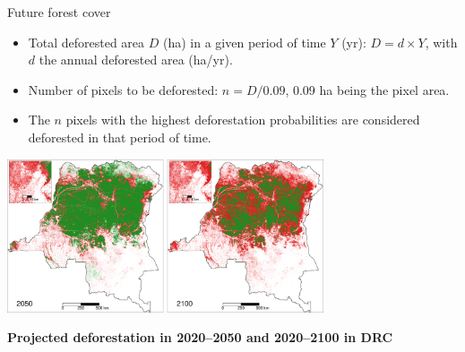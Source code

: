 \documentclass[10pt,table,dvipsnames,compress]{beamer}
\begin{document}
\begin{frame}[label={sec:orgfb3d1d3}]{Future forest cover}
\begin{itemize}
\item Total deforested area \(D\) (ha) in a given period of time \(Y\) (yr):
\(D=d \times Y\), with \(d\) the annual deforested area (ha/yr).
\item Number of pixels to be deforested: \(n=D/0.09\), 0.09 ha being the
pixel area.
\item The \(n\) pixels with the highest deforestation probabilities are
considered deforested in that period of time.
\end{itemize}

\centering \includegraphics[width=0.7\textwidth]{figs/sm/fcc2050_2100.png}

\textbf{Projected deforestation in 2020--2050 and 2020--2100 in DRC}
\end{frame}
\end{document}
